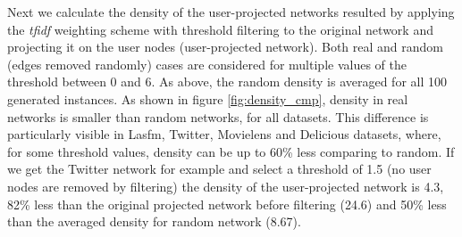 Next we calculate the density of the user-projected networks resulted by
applying the \emph{tfidf} weighting scheme with threshold filtering to the
original network and projecting it on the user nodes (user-projected network).
Both real and random (edges removed randomly) cases are considered for multiple
values of the threshold between 0 and 6. As above, the random density is
averaged for all 100 generated instances. As shown in figure
\ref{fig:density_cmp}, density in real networks is smaller than random networks,
for all datasets. This difference is particularly visible in Lasfm, Twitter,
Movielens and Delicious datasets, where, for some threshold values, density can
be up to 60\% less comparing to random. If we get the Twitter network for
example and select a threshold of 1.5 (no user nodes are removed by filtering)
the density of the user-projected network is 4.3, 82\% less than the original
projected network before filtering (24.6) and 50\% less than the averaged
density for random network (8.67).

